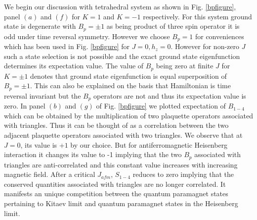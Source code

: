 \documentclass[aps,amsmath,twocolumn,amssymb,floatfix,showpacs,superscriptaddress,nofootinbib,longbibliography]{revtex4-1}
\begin{document}
 We begin our discussion with tetrahedral system as shown in Fig. \ref{bpfigure}, panel $(a)$ and $(f)$ for $K=1$ and $K=-1$ respectively. For this system ground state is degenerate with $B_p=\pm 1$  as being product of three spin operator it is odd under time reversal symmetry.  However we choose $B_p=1$ for conveniences which has been used in Fig. \ref{bpfigure} for $J=0, h_z=0$. However for non-zero $J$ such a state selection is not possible and the exact ground state eigenfunction determines  its expectation value. The value of $B_p$ being zero at finite $J$ for $K=\pm 1$ denotes that ground state eigenfunction is equal superposition of $B_p=\pm 1$. This can also be explained on the basis that Hamiltonian is time reversal invariant but the $B_p$ operators are not and thus its expectation value is zero. In panel $(b)$ and $(g)$ of Fig. \ref{bpfigure} we plotted expectation of $B_{1-4}$
which can be obtained by the multiplication of two plaquette operators associated with triangles. Thus it can be thought of as a correlation between the two adjacent plaquette operators associated with two triangles. We observe that at $J=0$, its value is $+1$ by our choice. But for antiferromagnetic Heisenberg interaction it changes its value to -1 implying that the two $B_p$ associated with triangles are anti-correlated and this constant value increases with increasing magnetic field. After a critical $J_{afm}$, $S_{1-4}$ reduces to zero implying that the conserved quantities associated with triangles are no longer correlated. It manifests an unique competition between the quantum paramagnet states pertaining to Kitaev limit and quantum paramagnet states in the Heisenberg limit.\\

\indent
\end{document}
